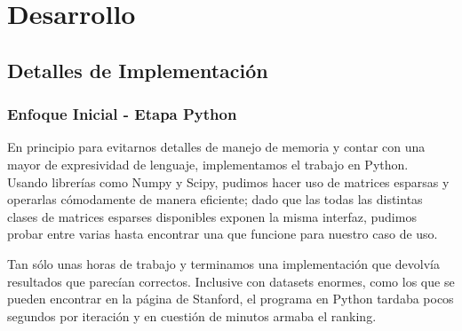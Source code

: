 \section{Desarrollo}

\subsection{Detalles de Implementación} %
\label{sub:detalles_de_implementaci_n}

\subsubsection{Enfoque Inicial - Etapa Python} %
\label{ssub:enfoque_inicial}

En principio para evitarnos detalles de manejo de memoria y contar con una mayor
de expresividad de lenguaje, implementamos el trabajo en Python.\\

Usando librerías como Numpy y Scipy, pudimos hacer uso de matrices
esparsas y operarlas cómodamente de manera eficiente; dado 
que las todas las distintas clases de matrices esparses disponibles
exponen la misma interfaz, pudimos probar entre varias hasta encontrar
una que funcione para nuestro caso de uso.

Tan sólo unas horas de trabajo y terminamos una implementación
que devolvía resultados que parecían correctos. Inclusive con datasets
enormes, como los que se pueden encontrar en la página de Stanford,
el programa en Python tardaba pocos segundos por iteración y en cuestión de minutos armaba el ranking.\\

